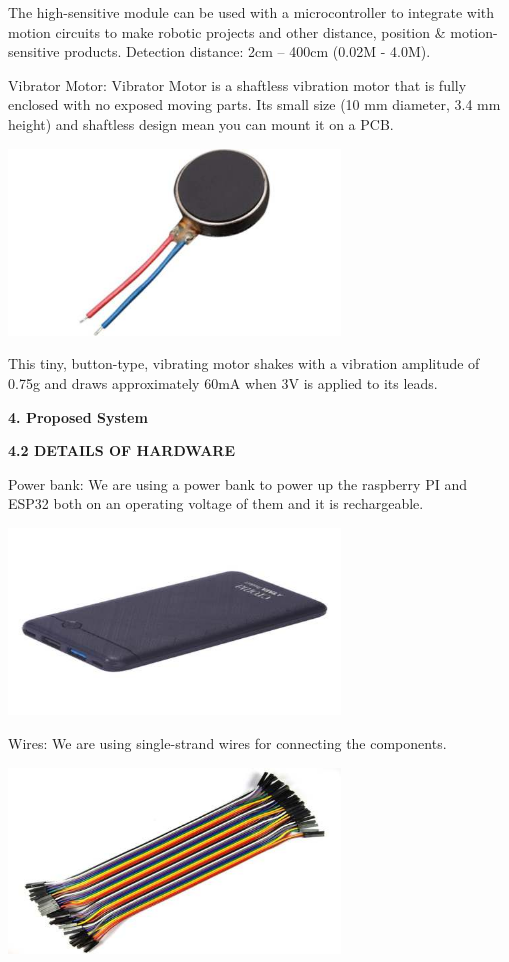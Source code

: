 \documentclass{article}
\begin{document}
The high-sensitive module can be used with a microcontroller to
integrate with motion circuits to make robotic projects and other
distance, position \& motion-sensitive products. Detection distance: 2cm
-- 400cm (0.02M - 4.0M).

{Vibrator Motor}: Vibrator Motor is a shaftless vibration motor that is
fully enclosed with no exposed moving parts. Its small size (10 mm
diameter, 3.4 mm height) and shaftless design mean you can mount it on a
PCB.

\includegraphics[width=3.46667in,height=1.95in]{media/6.jpg}

This tiny, button-type, vibrating motor shakes with a vibration
amplitude of 0.75g and draws approximately 60mA when 3V is applied to
its leads.

\textbf{4. Proposed System}

\textbf{4.2 DETAILS OF HARDWARE}

{Power bank}: We are using a power bank to power up the raspberry PI and
ESP32 both on an operating voltage of them and it is rechargeable.

\includegraphics[width=3.46667in,height=1.95in]{media/7.jpg}

{Wires}: We are using single-strand wires for connecting the components.

\includegraphics[width=3.46667in,height=1.95in]{media/8.jpg}
\end{document}
